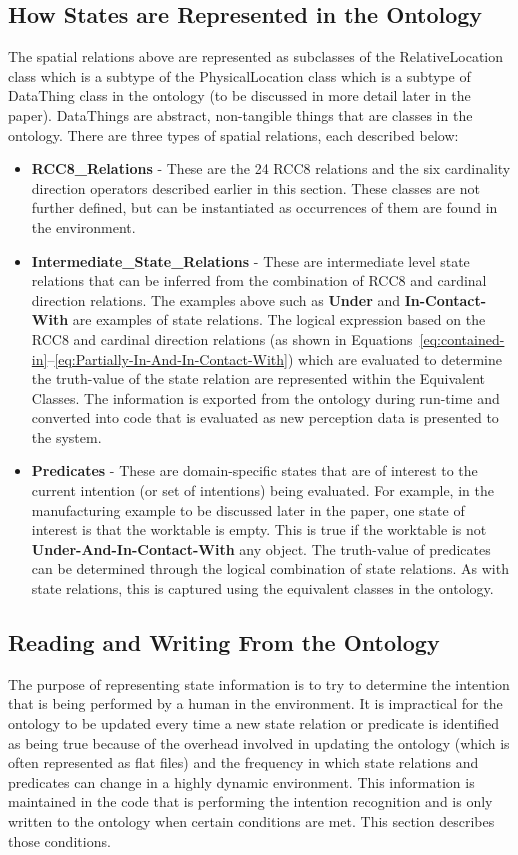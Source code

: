 \documentclass[preprint,12pt]{elsarticle}
\newcommand{\sr}[1] {\textbf{#1}}
\newcommand{\class}[1] {\textsf{#1}}
\begin{document}
\subsection{How States are Represented in the Ontology}
The spatial relations above are represented as subclasses of the \class{RelativeLocation} class which is a subtype of the \class{PhysicalLocation} class which is a subtype of \class{DataThing} class in the ontology (to be discussed in more detail later in the paper). \class{DataThings} are abstract, non-tangible things that are classes in the ontology. There are three types of spatial relations, each described below:
\begin{itemize}
\item \textbf{RCC8\_Relations} - These are the 24 RCC8 relations and the six cardinality direction operators described earlier in this section. These classes are not further defined, but can be instantiated as occurrences of them are found in the environment.
\item \textbf{Intermediate\_State\_Relations} - These are intermediate level state relations that can be inferred from the combination of RCC8 and cardinal direction relations. The examples above such as \sr{Under} and \sr{In-Contact-With} are examples of state relations. The logical expression based on the RCC8 and cardinal direction relations (as shown in Equations~\ref{eq:contained-in}--\ref{eq:Partially-In-And-In-Contact-With}) which are evaluated to determine the truth-value of the state relation are represented within the Equivalent Classes. The information is exported from the ontology during run-time and converted into code that is evaluated as new perception data is presented to the system.
\item \textbf{Predicates} - These are domain-specific states that are of interest to the current intention (or set of intentions) being evaluated. For example, in the manufacturing example to be discussed later in the paper, one state of interest is that the worktable is empty. This is true if the worktable is not \sr{Under-And-In-Contact-With} any object. The truth-value of predicates can be determined through the logical combination of state relations. As with state relations, this is captured using the equivalent classes in the ontology.
\end{itemize}


\subsection{Reading and Writing From the Ontology}
The purpose of representing state information is to try to determine the intention that is being performed by a human in the environment. It is impractical for the ontology to be updated every time a new state relation or predicate is identified as being true because of the overhead involved in updating the ontology (which is often represented as flat files) and the frequency in which state relations and predicates can change in a highly dynamic environment.  This information is maintained in the code that is performing the intention recognition and is only written to the ontology when certain conditions are met. This section describes those conditions.
\end{document}
